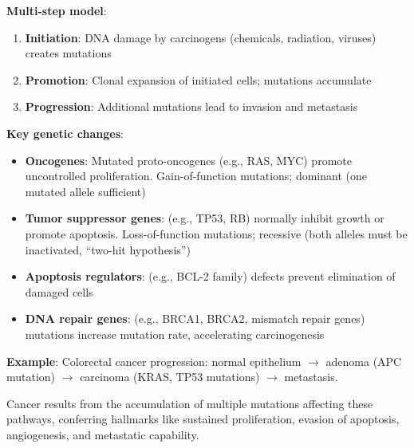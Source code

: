 \documentclass[11pt]{article}
\begin{document}
\begin{enumerate}[label=\textbf{\arabic*.}]
  \textbf{Multi-step model}:
  \begin{enumerate}
    \item \textbf{Initiation}: DNA damage by carcinogens (chemicals, radiation, viruses) creates mutations
    \item \textbf{Promotion}: Clonal expansion of initiated cells; mutations accumulate
    \item \textbf{Progression}: Additional mutations lead to invasion and metastasis
  \end{enumerate}

  \textbf{Key genetic changes}:
  \begin{itemize}
    \item \textbf{Oncogenes}: Mutated proto-oncogenes (e.g., RAS, MYC) promote uncontrolled proliferation. 
    Gain-of-function mutations; dominant (one mutated allele sufficient)
    \item \textbf{Tumor suppressor genes}: (e.g., TP53, RB) normally inhibit growth or promote apoptosis. 
    Loss-of-function mutations; recessive (both alleles must be inactivated, ``two-hit hypothesis'')
    \item \textbf{Apoptosis regulators}: (e.g., BCL-2 family) defects prevent elimination of damaged cells
    \item \textbf{DNA repair genes}: (e.g., BRCA1, BRCA2, mismatch repair genes) mutations increase 
    mutation rate, accelerating carcinogenesis
  \end{itemize}

  \textbf{Example}: Colorectal cancer progression: normal epithelium $\to$ adenoma (APC mutation) $\to$ 
  carcinoma (KRAS, TP53 mutations) $\to$ metastasis.

  Cancer results from the accumulation of multiple mutations affecting these pathways, conferring 
  hallmarks like sustained proliferation, evasion of apoptosis, angiogenesis, and metastatic capability.

\end{enumerate}
\end{document}
